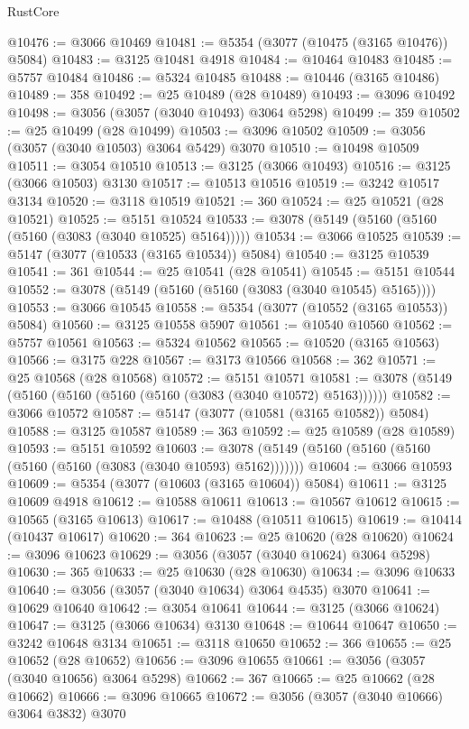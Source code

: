 \begin{lexlean}{RustCore}
\begin{coremodule}
@10476 := @3066 @10469
@10481 := @5354 (@3077 (@10475 (@3165 @10476)) @5084)
@10483 := @3125 @10481 @4918
@10484 := @10464 @10483
@10485 := @5757 @10484
@10486 := @5324 @10485
@10488 := @10446 (@3165 @10486)
@10489 := 358
@10492 := @25 @10489 (@28 @10489)
@10493 := @3096 @10492
@10498 := @3056 (@3057 (@3040 @10493) @3064 @5298)
@10499 := 359
@10502 := @25 @10499 (@28 @10499)
@10503 := @3096 @10502
@10509 := @3056 (@3057 (@3040 @10503) @3064 @5429) @3070
@10510 := @10498 @10509
@10511 := @3054 @10510
@10513 := @3125 (@3066 @10493)
@10516 := @3125 (@3066 @10503) @3130
@10517 := @10513 @10516
@10519 := @3242 @10517 @3134
@10520 := @3118 @10519
@10521 := 360
@10524 := @25 @10521 (@28 @10521)
@10525 := @5151 @10524
@10533 := @3078 (@5149 (@5160 (@5160 (@5160 (@3083 (@3040 @10525) @5164)))))
@10534 := @3066 @10525
@10539 := @5147 (@3077 (@10533 (@3165 @10534)) @5084)
@10540 := @3125 @10539
@10541 := 361
@10544 := @25 @10541 (@28 @10541)
@10545 := @5151 @10544
@10552 := @3078 (@5149 (@5160 (@5160 (@3083 (@3040 @10545) @5165))))
@10553 := @3066 @10545
@10558 := @5354 (@3077 (@10552 (@3165 @10553)) @5084)
@10560 := @3125 @10558 @5907
@10561 := @10540 @10560
@10562 := @5757 @10561
@10563 := @5324 @10562
@10565 := @10520 (@3165 @10563)
@10566 := @3175 @228
@10567 := @3173 @10566
@10568 := 362
@10571 := @25 @10568 (@28 @10568)
@10572 := @5151 @10571
@10581 := @3078 (@5149 (@5160 (@5160 (@5160 (@5160 (@3083 (@3040 @10572) @5163))))))
@10582 := @3066 @10572
@10587 := @5147 (@3077 (@10581 (@3165 @10582)) @5084)
@10588 := @3125 @10587
@10589 := 363
@10592 := @25 @10589 (@28 @10589)
@10593 := @5151 @10592
@10603 := @3078 (@5149 (@5160 (@5160 (@5160 (@5160 (@5160 (@3083 (@3040 @10593) @5162)))))))
@10604 := @3066 @10593
@10609 := @5354 (@3077 (@10603 (@3165 @10604)) @5084)
@10611 := @3125 @10609 @4918
@10612 := @10588 @10611
@10613 := @10567 @10612
@10615 := @10565 (@3165 @10613)
@10617 := @10488 (@10511 @10615)
@10619 := @10414 (@10437 @10617)
@10620 := 364
@10623 := @25 @10620 (@28 @10620)
@10624 := @3096 @10623
@10629 := @3056 (@3057 (@3040 @10624) @3064 @5298)
@10630 := 365
@10633 := @25 @10630 (@28 @10630)
@10634 := @3096 @10633
@10640 := @3056 (@3057 (@3040 @10634) @3064 @4535) @3070
@10641 := @10629 @10640
@10642 := @3054 @10641
@10644 := @3125 (@3066 @10624)
@10647 := @3125 (@3066 @10634) @3130
@10648 := @10644 @10647
@10650 := @3242 @10648 @3134
@10651 := @3118 @10650
@10652 := 366
@10655 := @25 @10652 (@28 @10652)
@10656 := @3096 @10655
@10661 := @3056 (@3057 (@3040 @10656) @3064 @5298)
@10662 := 367
@10665 := @25 @10662 (@28 @10662)
@10666 := @3096 @10665
@10672 := @3056 (@3057 (@3040 @10666) @3064 @3832) @3070

\end{coremodule}
\end{lexlean}
